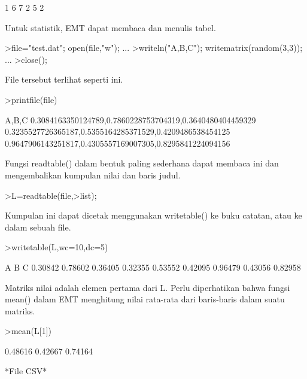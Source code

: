 \documentclass[a4paper,10pt]{article}
\begin{document}
\begin{eulernotebook}
\begin{eulercomment}
\begin{eulercomment}
\begin{eulercomment}
\begin{eulercomment}
\begin{eulercomment}
\begin{eulercomment}
\begin{euleroutput}
         1       6       7
         2       5       2
\end{euleroutput}
\begin{eulercomment}
Untuk statistik, EMT dapat membaca dan menulis tabel.
\end{eulercomment}
\begin{eulerprompt}
>file="test.dat"; open(file,"w"); ...
>writeln("A,B,C"); writematrix(random(3,3)); ...
>close();
\end{eulerprompt}
\begin{eulercomment}
File tersebut terlihat seperti ini.
\end{eulercomment}
\begin{eulerprompt}
>printfile(file)
\end{eulerprompt}
\begin{euleroutput}
  A,B,C
  0.3084163350124789,0.7860228753704319,0.3640480404459329
  0.3235527726365187,0.5355164285371529,0.4209486538454125
  0.9647906143251817,0.4305557169007305,0.8295841224094156
  
\end{euleroutput}
\begin{eulercomment}
Fungsi readtable() dalam bentuk paling sederhana dapat membaca ini dan
mengembalikan kumpulan nilai dan baris judul.
\end{eulercomment}
\begin{eulerprompt}
>L=readtable(file,>list);
\end{eulerprompt}
\begin{eulercomment}
Kumpulan ini dapat dicetak menggunakan writetable() ke buku catatan,
atau ke dalam sebuah file.
\end{eulercomment}
\begin{eulerprompt}
>writetable(L,wc=10,dc=5)
\end{eulerprompt}
\begin{euleroutput}
           A         B         C
     0.30842   0.78602   0.36405
     0.32355   0.53552   0.42095
     0.96479   0.43056   0.82958
\end{euleroutput}
\begin{eulercomment}
Matriks nilai adalah elemen pertama dari L. Perlu diperhatikan bahwa
fungsi mean() dalam EMT menghitung nilai rata-rata dari baris-baris
dalam suatu matriks.
\end{eulercomment}
\begin{eulerprompt}
>mean(L[1])
\end{eulerprompt}
\begin{euleroutput}
    0.48616 
    0.42667 
    0.74164 
\end{euleroutput}
\begin{eulercomment}
*File CSV*


\end{eulercomment}
\end{eulercomment}
\end{eulercomment}
\end{eulercomment}
\end{eulercomment}
\end{eulercomment}
\end{eulercomment}
\end{eulernotebook}
\end{document}
